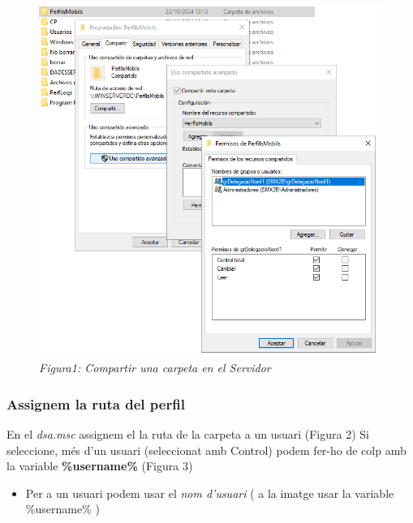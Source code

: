\documentclass[
  a4paper,
]{article}
\providecommand{\tightlist}{%
  \setlength{\itemsep}{0pt}\setlength{\parskip}{0pt}}
\begin{document}
\begin{figure}
\centering
\includegraphics{png/CarpetaPerfilsMobils.png}
\caption{\emph{Figura1: Compartir una carpeta en el Servidor}}
\end{figure}

\subsubsection{Assignem la ruta del
perfil}\label{assignem-la-ruta-del-perfil}

En el \emph{dsa.msc} assignem el la ruta de la carpeta a un usuari
(Figura 2) Si seleccione, més d'un usuari (seleccionat amb Control)
podem fer-ho de colp amb la variable \textbf{\%username\%} (Figura 3)

\begin{itemize}
\tightlist
\item
  Per a un usuari podem usar el \emph{nom d'usuari} ( a la imatge usar
  la variable \%username\% )
\end{itemize}
\end{document}
